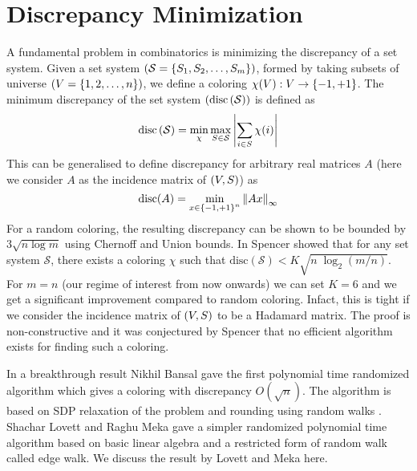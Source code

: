 \section{Discrepancy Minimization}
A fundamental problem in combinatorics is minimizing the discrepancy of a set system. 
Given a set system $\left(\mathcal{S} = \left\{S_1,S_2,\hdots,S_m\right\} \right )$, formed by taking subsets of universe $\left(V = \left\{1,2,\hdots,n\right\} \right )$, we define a coloring $\chi(V) : V \to \left\{-1,+1\right\}$.
The minimum discrepancy of the set system $\left(\text{disc}\left(\mathcal{S} \right ) \right )$ is defined as 
\[ \text{disc}\left(\mathcal{S} \right ) = \min_{\chi}\max_{S \in \mathcal{S}}{\left\lvert \sum_{i \in S}{\chi(i)} \right\rvert} \]
This can be generalised to define discrepancy for arbitrary real matrices $A$ (here we consider $A$ as the incidence matrix of $\left(V,S \right )$) as 
\[ \text{disc}(A) = \min_{x \in \left\{-1,+1\right\}^n} \left\lVert Ax \right\rVert_{\infty}\]
For a random coloring, the resulting discrepancy can be shown to be bounded by $3\sqrt{n\log m}$ using Chernoff and Union bounds.
In \cite{Spencer1985} Spencer showed that for any set system $\mathcal{S}$, there exists a coloring $\chi$ such that $\text{disc}(\mathcal{S}) < K\sqrt{n\;\log_2{(m/n)}}$.
For $m=n$ (our regime of interest from now onwards) we can set $K=6$ and we get a significant improvement compared to random coloring. 
Infact, this is tight if we consider the incidence matrix of $\left(V,S \right )$ to be a Hadamard matrix. The proof is non-constructive and it was conjectured by Spencer that no efficient algorithm exists for finding such a coloring. 

In a breakthrough result \cite{bansal10cadm} Nikhil Bansal gave the first polynomial time randomized algorithm which gives a coloring with discrepancy $O(\sqrt{n})$.
The algorithm is based on SDP relaxation of the problem and rounding using random walks .
Shachar Lovett and Raghu Meka \cite{12lovettmeka} gave a simpler randomized polynomial time algorithm based on basic linear algebra and a restricted form of random walk called edge walk.
We discuss the result by Lovett and Meka here.

